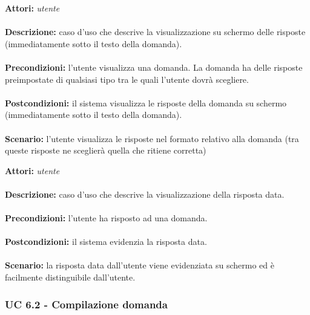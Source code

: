 \documentclass[a4paper,11pt]{article}
\begin{document}

\textbf{Attori:} \textit{utente}
\\ \\
\textbf{Descrizione:} caso d'uso che descrive la visualizzazione su schermo delle risposte (immediatamente sotto il testo della domanda).\\
\\
\textbf{Precondizioni:} l'utente visualizza una domanda. La domanda ha delle risposte preimpostate di qualsiasi tipo tra le quali l'utente dovrà scegliere.\\
\\
\textbf{Postcondizioni:} il sistema visualizza le risposte della domanda su schermo (immediatamente sotto il testo della domanda).\\
\\
\textbf{Scenario:} l’utente visualizza le risposte nel formato relativo alla domanda (tra queste risposte ne sceglierà quella che ritiene corretta)\\



\textbf{Attori:} \textit{utente}
\\ \\
\textbf{Descrizione:} caso d'uso che descrive la visualizzazione della risposta data.\\
\\
\textbf{Precondizioni:} l'utente ha risposto ad una domanda.\\
\\
\textbf{Postcondizioni:} il sistema evidenzia la risposta data.\\
\\
\textbf{Scenario:} la risposta data dall'utente viene evidenziata su schermo ed è facilmente distinguibile dall'utente.\\


\newpage
\subsubsection{UC 6.2 - Compilazione domanda}
\end{document}
